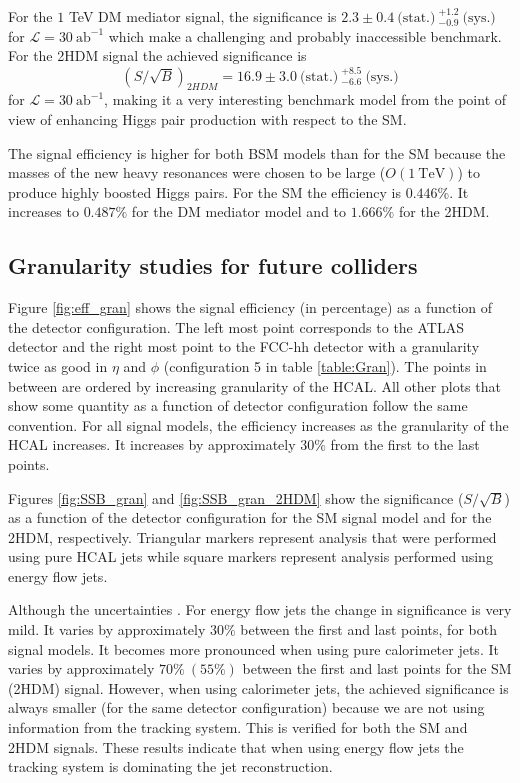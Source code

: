 For the $1$ TeV DM mediator signal, the significance is $2.3\pm0.4~\text{(stat.)}~^{+1.2}_{-0.9}~\text{(sys.)}$ for $\mathcal{L}=30~\text{ab}^{-1}$ which make a challenging and probably inaccessible benchmark. For the 2HDM signal the achieved significance is 
\begin{equation}
	(S/\sqrt{B})_{2HDM}=16.9\pm 3.0~\text{(stat.)}~^{+8.5}_{-6.6}~\text{(sys.)}
\end{equation}
for $\mathcal{L}=30~\text{ab}^{-1}$, making it a very interesting benchmark model from the point of view of enhancing Higgs pair production with respect to the SM. 

The signal efficiency is higher for both BSM models than for the SM because the masses of the new heavy resonances were chosen to be large ($O(1 ~\text{TeV})$) to produce highly boosted Higgs pairs. For the SM the efficiency is $0.446\%$. It increases to $0.487\%$ for the DM mediator model and to $1.666\%$ for the 2HDM. 

\subsection{Granularity studies for future colliders}
\label{sec:gran_studies}

Figure \ref{fig:eff_gran} shows the signal efficiency (in percentage) as a function of the detector configuration. The left most point corresponds to the ATLAS detector and the right most point to the FCC-hh detector with a granularity twice as good in $\eta$ and $\phi$ (configuration 5 in table \ref{table:Gran}). The points in between are ordered by increasing granularity of the HCAL. All other plots that show some quantity as a function of detector configuration follow the same convention. For all signal models, the efficiency increases as the granularity of the HCAL increases. It increases by approximately $30\%$ from the first to the last points.

Figures \ref{fig:SSB_gran} and \ref{fig:SSB_gran_2HDM} show the significance ($S/\sqrt{B}$) as a function of the detector configuration for the SM signal model and for the 2HDM, respectively. Triangular markers represent analysis that were performed using pure HCAL jets while square markers represent analysis performed using energy flow jets. 

Although the uncertainties . For energy flow jets the change in significance is very mild. It varies by approximately $30\%$ between the first and last points, for both signal models. It becomes more pronounced when using pure calorimeter jets. It varies by approximately $70\%~(55\%)$ between the first and last points for the SM (2HDM) signal. However, when using calorimeter jets, the achieved significance is always smaller (for the same detector configuration) because we are not using information from the tracking system. This is verified for both the SM and 2HDM signals. These results indicate that when using energy flow jets the tracking system is dominating the jet reconstruction.

